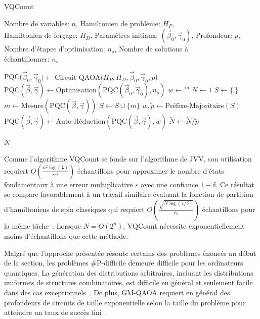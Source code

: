 \begin{algorithm}[h!]
    \caption{VQCount}\label{alg:vqcount}
    \begin{algorithmic}[1]
    \REQUIRE Nombre de variables: $n$, Hamiltonien de problème: $H_P$,\\Hamiltonien de forçage: $H_D$, Paramètres initiaux: $(\vec{\beta}_0, \vec{\gamma}_0)$, Profondeur: $p$, Nombre d'étapes d'optimisation: $n_{o}$, Nombre de solutions à\\échantillonner: $n_s$
    
    \STATE PQC($\vec{\beta}_0, \vec{\gamma}_0) \leftarrow \text{Circuit-QAOA}(H_P, H_D, \vec{\beta}_0, \vec{\gamma}_0, p$)
    \STATE $\text{PQC}(\vec{\beta}, \vec{\gamma}) \leftarrow \text{Optimisation}(\text{PQC}(\vec{\beta}_0, \vec{\gamma}_0), n_{o})$
    \STATE $w \leftarrow \texttt{""}$ 
    \STATE $\tilde{N} \leftarrow 1$
    \STATE $S \leftarrow \{ \ \}$
    \STATE $m \leftarrow \text{Mesure}(\text{PQC}(\vec{\beta}, \vec{\gamma}))$
    \STATE $S \leftarrow S \cup \{m\}$
    \ENDIF
    \ENDWHILE
    \STATE $w, \tilde{p} \leftarrow \text{Préfixe-Majoritaire}(S)$
    \STATE $\text{PQC}(\vec{\beta}, \vec{\gamma}) \leftarrow \text{Auto-Réduction}(\text{PQC}(\vec{\beta}, \vec{\gamma}), w)$
    \STATE $\tilde{N} \leftarrow \tilde{N} / \tilde{p}$
    \ENDFOR
    
    \RETURN $\tilde{N}$
\end{algorithmic}
\end{algorithm}
    
Comme l'algorithme VQCount se fonde sur l'algorithme de JVV, son utilisation requiert $O(\frac{n^{2} \log (\frac{1}{\delta})}{r \varepsilon^{2}})$ échantillons pour approximer le nombre d'états fondamentaux à une erreur multiplicative $\varepsilon$ avec une confiance $1 - \delta$. Ce résultat se compare favorablement à un travail similaire évaluant la fonction de partition d'hamiltoniens de spin classiques qui requiert $O(\frac{\sqrt{N \log(1 / \delta)}}{r \varepsilon})$ échantillons pour la même tâche~\cite{sundarQuantumAlgorithmCount2019}. Lorsque $N=O(2^{n})$, VQCount nécessite exponentiellement moins d'échantillons que cette méthode.

Malgré que l'approche présentée résoute certains des problèmes énoncés au début de la section, les problèmes \textsf{\#P}-difficile demeure difficile pour les ordinateurs quantiques. La génération des distributions arbitraires, incluant les distributions uniformes de structures combinatoires, est difficile en général et seulement facile dans des cas exceptionnels~\cite{aaronsonComputationalComplexityLinear2011, boulandComplexityVerificationQuantum2019}. De plus, GM-QAOA requiert en général des profondeurs de circuits de taille exponentielle selon la taille du problème pour atteindre un taux de succès fini~\cite{xiePerformanceUpperBound2025}. 

